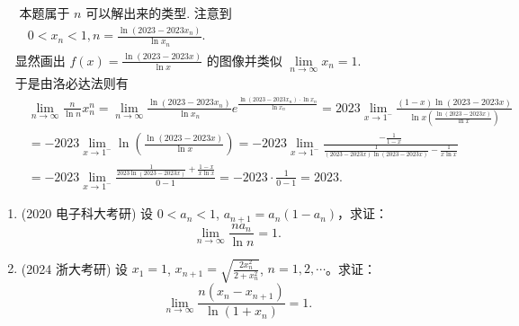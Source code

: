 \documentclass[lang=cn,10pt,thmcnt=section]{elegantbook}
\begin{document}
\begin{example}
	\begin{align*}
		&\text{ 本题属于 } n \text{ 可以解出来的类型. 注意到} \\
		&\quad 0 < x_n < 1, n = \frac{\ln(2023 - 2023x_n)}{\ln x_n}. \\
		&\text{显然画出 } f(x) = \frac{\ln(2023 - 2023x)}{\ln x} \text{ 的图像并类似\ } \lim_{n \to \infty} x_n = 1. \\
		&\text{于是由洛必达法则有} \\
		&\quad \lim_{n \to \infty} \frac{n}{\ln n} x_n^n = \lim_{n \to \infty} \frac{\ln(2023 - 2023x_n)}{\ln x_n} e^{\frac{\ln(2023 - 2023x_n) \cdot \ln x_n}{\ln x_n}} = 2023 \lim_{x \to 1^-} \frac{(1-x) \ln(2023 - 2023x)}{\ln x \left( \frac{\ln(2023 - 2023x)}{\ln x} \right)} \\
		&\quad = -2023 \lim_{x \to 1^-} \ln \left( \frac{\ln(2023 - 2023x)}{\ln x} \right) = -2023 \lim_{x \to 1^-} \frac{-\frac{1}{1-x}}{\frac{1}{(2023 - 2023x) \ln(2023 - 2023x)} - \frac{1}{x \ln x}} \\
		&\quad = -2023 \lim_{x \to 1^-} \frac{\frac{1}{2023 \ln(2023 - 2023x)} + \frac{1-x}{x \ln x}}{0 - 1} = -2023 \cdot \frac{1}{0 - 1} = 2023.
		\end{align*}
\end{example}
\begin{example}
	\begin{enumerate}
		\item (2020 电子科大考研) 设 $0 < a_n < 1$, $a_{n+1} = a_n (1 - a_n)$，求证：
		\[
		\lim_{n \to \infty} \frac{n a_n}{\ln n} = 1.
		\]
		
		\item (2024 浙大考研) 设 $x_1 = 1$, $x_{n+1} = \sqrt{\frac{2x_n^2}{2 + x_n^2}}$, $n = 1, 2, \cdots$。求证：
		\[
		\lim_{n \to \infty} \frac{n(x_n - x_{n+1})}{\ln (1 + x_n)} = 1.
		\]
	\end{enumerate}
\end{example}
\end{document}
